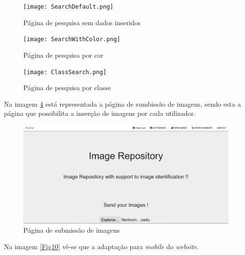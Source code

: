 \documentclass{report}
\begin{document}
\begin{figure}[H]
\texttt{[image: SearchDefault.png]}
\caption{Página de pesquisa sem dados inseridos}
\label{Fig6}
\end{figure}

\begin{figure}[H]
\texttt{[image: SearchWithColor.png]}
\caption{Página de pesquisa por cor}
\label{Fig7}
\end{figure}

\begin{figure}[H]
\texttt{[image: ClassSearch.png]}
\caption{Página de pesquisa por classe}
\label{Fig8}
\end{figure}

Na imagem \ref{Fig9} está representada a página de sumbissão de imagens, sendo esta a página que possibilita a inserção de imagens por cada utilizador.

\begin{figure}[H]
\includegraphics[width=\textwidth]{Send.png}
\caption{Página de submissão de imagens}
\label{Fig9}
\end{figure}

Na imagem \ref{Fig10} vê-se que a adaptação para \textit{mobile} do \textit{website}.
\end{document}
